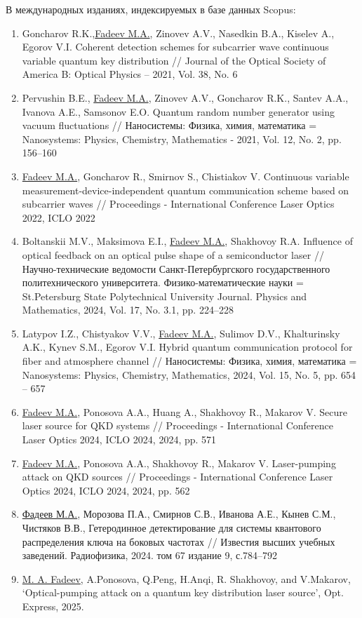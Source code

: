 В международных изданиях, индексируемых в базе данных Scopus:\\
\begin{enumerate}
    \item Goncharov R.K.,\underline{Fadeev M.A.}, Zinovev A.V., Nasedkin B.A., Kiselev A., Egorov V.I. Coherent detection schemes for subcarrier wave continuous variable quantum key distribution // Journal of the Optical Society of America B: Optical Physics -- 2021, Vol. 38, No. 6
    \item Pervushin B.E., \underline{Fadeev M.A.}, Zinovev A.V., Goncharov R.K., Santev A.A., Ivanova A.E., Samsonov E.O. Quantum random number generator using vacuum fluctuations // Наносистемы: Физика, химия, математика = Nanosystems: Physics, Chemistry, Mathematics - 2021, Vol. 12, No. 2, pp. 156--160
    \item \underline{Fadeev M.A.}, Goncharov R., Smirnov S., Chistiakov V. Continuous variable measurement-device-independent quantum communication scheme based on subcarrier waves // Proceedings - International Conference Laser Optics 2022, ICLO 2022
    \item Boltanskii M.V., Maksimova E.I., \underline{Fadeev M.A.}, Shakhovoy R.A. Influence of optical feedback on an optical pulse shape of a semiconductor laser // Научно-технические ведомости Санкт-Петербургского государственного политехнического университета. Физико-математические науки = St.Petersburg State Polytechnical University Journal. Physics and Mathematics, 2024, Vol. 17, No. 3.1, pp. 224--228
    \item Latypov I.Z., Chistyakov V.V., \underline{Fadeev M.A.}, Sulimov D.V., Khalturinsky A.K., Kynev S.M., Egorov V.I. Hybrid quantum communication protocol for fiber and atmosphere channel // Наносистемы: Физика, химия, математика = Nanosystems: Physics, Chemistry, Mathematics, 2024, Vol. 15, No. 5, pp. 654 -- 657
    \item \underline{Fadeev M.A.}, Ponosova A.A., Huang A., Shakhovoy R., Makarov V. Secure laser source for QKD systems // Proceedings - International Conference Laser Optics 2024, ICLO 2024, 2024, pp. 571
    \item \underline{Fadeev M.A.}, Ponosova A.A., Shakhovoy R., Makarov V. Laser-pumping attack on QKD sources // Proceedings - International Conference Laser Optics 2024, ICLO 2024, 2024, pp. 562
    \item \underline{Фадеев М.А.}, Морозова П.А., Смирнов С.В., Иванова А.Е., Кынев С.М., Чистяков В.В., Гетеродинное детектирование для системы квантового распределения ключа на боковых частотах // Известия высших учебных заведений. Радиофизика, 2024. том 67 издание 9, с.784--792
    \item \underline{M. A. Fadeev}, A.Ponosova, Q.Peng, H.Anqi, R. Shakhovoy, and V.Makarov, `Optical-pumping attack on a quantum key distribution laser source', Opt. Express, 2025.

\end{enumerate}

